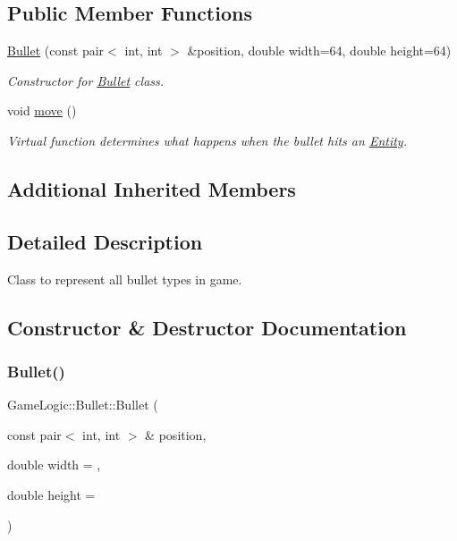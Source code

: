\subsection*{Public Member Functions}
\begin{DoxyCompactItemize}
\item 
\hyperlink{classGameLogic_1_1Bullet_a1a9519e2cd64746d3e545d45734ffddf}{Bullet} (const pair$<$ int, int $>$ \&position, double width=64, double height=64)
\begin{DoxyCompactList}\small\item\em Constructor for \hyperlink{classGameLogic_1_1Bullet}{Bullet} class. \end{DoxyCompactList}\item 
void \hyperlink{classGameLogic_1_1Bullet_a8581833f7a73cef83411fa988f6fe94d}{move} ()
\begin{DoxyCompactList}\small\item\em Virtual function determines what happens when the bullet hits an \hyperlink{classGameLogic_1_1Entity}{Entity}. \end{DoxyCompactList}\end{DoxyCompactItemize}
\subsection*{Additional Inherited Members}


\subsection{Detailed Description}
Class to represent all bullet types in game. 

\subsection{Constructor \& Destructor Documentation}
\mbox{\label{classGameLogic_1_1Bullet_a1a9519e2cd64746d3e545d45734ffddf}} 
\subsubsection{\texorpdfstring{Bullet()}{Bullet()}}
{\footnotesize\ttfamily Game\+Logic\+::\+Bullet\+::\+Bullet (\begin{DoxyParamCaption}\item[{const pair$<$ int, int $>$ \&}]{position,  }\item[{double}]{width = {},  }\item[{double}]{height = {} }\end{DoxyParamCaption})\hspace{0.3cm}{\ttfamily [explicit]}}

